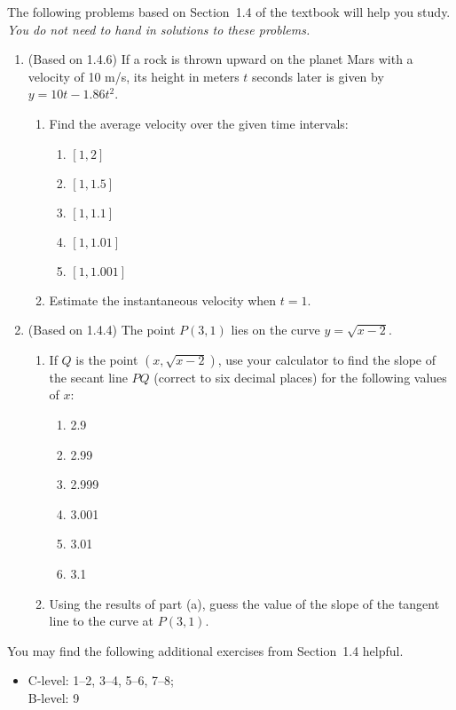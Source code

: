 \documentclass{article}
\title{\commonPSTitleZeroOneFour}
\author{\commonAuthor}
\date{\commonDateZeroOneFour}
\begin{document}
\maketitle
\thispagestyle{empty}

\noindent
The following problems based on Section~1.4 of the textbook will help
you study.  \emph{You do not need to hand in solutions to these
  problems.}
\begin{enumerate}
\item (Based on 1.4.6)
  If a rock is thrown upward on the planet Mars with a velocity of 10 m/s,
  its height in meters $t$ seconds later is given by $y=10t-1.86t^2$.
  \begin{enumerate}
  \item Find the average velocity over the given time intervals:
    \begin{multicols}{3}
    \begin{enumerate}
    \item $[1,2]$
    \item $[1,1.5]$
    \item $[1,1.1]$
    \item $[1,1.01]$
    \item $[1,1.001]$
    \end{enumerate}
    \end{multicols}
  \item Estimate the instantaneous velocity when $t=1$.
  \end{enumerate}
\item (Based on 1.4.4)
  The point $P(3,1)$ lies on the curve $y=\sqrt{x-2}$.
  \begin{enumerate}
  \item If $Q$ is the point $(x,\sqrt{x-2})$, use your calculator to find
    the slope of the secant line $PQ$ (correct to six decimal places) for the
    following values of $x$:
    \begin{multicols}{4}
    \begin{enumerate}
    \item 2.9
    \item 2.99
    \item 2.999
    \item 3.001
    \item 3.01
    \item 3.1
    \end{enumerate}
    \end{multicols}
  \item Using the results of part (a), guess the value of the slope of the
    tangent line to the curve at $P(3,1)$.
  \end{enumerate}
\end{enumerate}

\noindent
You may find the following additional exercises from Section~1.4 helpful.
\begin{itemize}
\item[1.4] C-level: 1--2, 3--4, 5--6, 7--8; \\ B-level: 9
\end{itemize}
\end{document}
